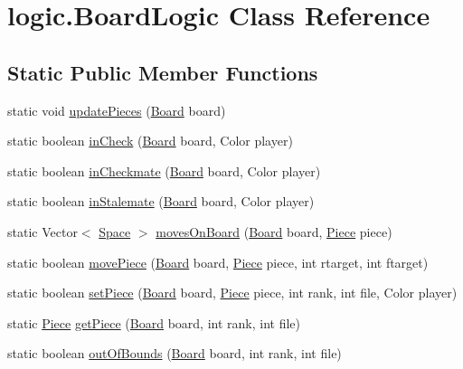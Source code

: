 \hypertarget{classlogic_1_1BoardLogic}{\section{logic.\-Board\-Logic Class Reference}
\label{classlogic_1_1BoardLogic}
}
\subsection*{Static Public Member Functions}
\begin{DoxyCompactItemize}
\item 
static void \hyperlink{classlogic_1_1BoardLogic_a8805b83ab700a29dcc71d66803199adf}{update\-Pieces} (\hyperlink{classmodel_1_1Board}{Board} board)
\item 
static boolean \hyperlink{classlogic_1_1BoardLogic_a1117819fcc1471cb01799198d14f3e4c}{in\-Check} (\hyperlink{classmodel_1_1Board}{Board} board, Color player)
\item 
static boolean \hyperlink{classlogic_1_1BoardLogic_ab5d863552542c372796ceff388e6a42b}{in\-Checkmate} (\hyperlink{classmodel_1_1Board}{Board} board, Color player)
\item 
static boolean \hyperlink{classlogic_1_1BoardLogic_accfe2bf1822c3b6abbcb66cb2e78e7b9}{in\-Stalemate} (\hyperlink{classmodel_1_1Board}{Board} board, Color player)
\item 
static Vector$<$ \hyperlink{classmodel_1_1Space}{Space} $>$ \hyperlink{classlogic_1_1BoardLogic_a1362b857bf585f1bfe2a1b55377d3ae6}{moves\-On\-Board} (\hyperlink{classmodel_1_1Board}{Board} board, \hyperlink{classpiece_1_1Piece}{Piece} piece)
\item 
static boolean \hyperlink{classlogic_1_1BoardLogic_a20d53bc0146f9c90598880bd8f731fe4}{move\-Piece} (\hyperlink{classmodel_1_1Board}{Board} board, \hyperlink{classpiece_1_1Piece}{Piece} piece, int rtarget, int ftarget)
\item 
static boolean \hyperlink{classlogic_1_1BoardLogic_a5fec15d32e299f21a067c90a1d28afbf}{set\-Piece} (\hyperlink{classmodel_1_1Board}{Board} board, \hyperlink{classpiece_1_1Piece}{Piece} piece, int rank, int file, Color player)
\item 
static \hyperlink{classpiece_1_1Piece}{Piece} \hyperlink{classlogic_1_1BoardLogic_ad087d5f282d8bc4291263a2135dd3466}{get\-Piece} (\hyperlink{classmodel_1_1Board}{Board} board, int rank, int file)
\item 
static boolean \hyperlink{classlogic_1_1BoardLogic_a84fa3af836d6218a29167e97f22962fe}{out\-Of\-Bounds} (\hyperlink{classmodel_1_1Board}{Board} board, int rank, int file)
\end{DoxyCompactItemize}


